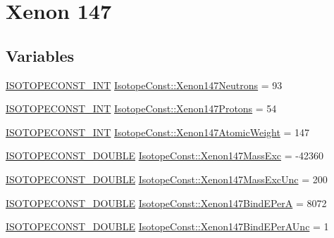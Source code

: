 \hypertarget{group___isotope_const-_xenon-_xe147}{}\section{Xenon 147}
\label{group___isotope_const-_xenon-_xe147}
\subsection*{Variables}
\begin{DoxyCompactItemize}
\item 
\mbox{\hyperlink{group___isotope_const-_macros_ga5f18360b3e99483a35c32d789e62621c}{I\+S\+O\+T\+O\+P\+E\+C\+O\+N\+S\+T\+\_\+\+I\+NT}} \mbox{\hyperlink{group___isotope_const-_xenon-_xe147_ga287624af3bd04def65eb9a491a60a459}{Isotope\+Const\+::\+Xenon147\+Neutrons}} = 93
\item 
\mbox{\hyperlink{group___isotope_const-_macros_ga5f18360b3e99483a35c32d789e62621c}{I\+S\+O\+T\+O\+P\+E\+C\+O\+N\+S\+T\+\_\+\+I\+NT}} \mbox{\hyperlink{group___isotope_const-_xenon-_xe147_ga8760fc45fccfb57b2619b30d8e229024}{Isotope\+Const\+::\+Xenon147\+Protons}} = 54
\item 
\mbox{\hyperlink{group___isotope_const-_macros_ga5f18360b3e99483a35c32d789e62621c}{I\+S\+O\+T\+O\+P\+E\+C\+O\+N\+S\+T\+\_\+\+I\+NT}} \mbox{\hyperlink{group___isotope_const-_xenon-_xe147_ga61a449ca5933362c6cceae5045a863a5}{Isotope\+Const\+::\+Xenon147\+Atomic\+Weight}} = 147
\item 
\mbox{\hyperlink{group___isotope_const-_macros_ga8f45a7272ce02c0b4c65c44636ed719a}{I\+S\+O\+T\+O\+P\+E\+C\+O\+N\+S\+T\+\_\+\+D\+O\+U\+B\+LE}} \mbox{\hyperlink{group___isotope_const-_xenon-_xe147_ga539ebada0711fb03d4ae15e50eb2a903}{Isotope\+Const\+::\+Xenon147\+Mass\+Exc}} = -\/42360
\item 
\mbox{\hyperlink{group___isotope_const-_macros_ga8f45a7272ce02c0b4c65c44636ed719a}{I\+S\+O\+T\+O\+P\+E\+C\+O\+N\+S\+T\+\_\+\+D\+O\+U\+B\+LE}} \mbox{\hyperlink{group___isotope_const-_xenon-_xe147_ga560b3220fae8073f2da464699b1b16b9}{Isotope\+Const\+::\+Xenon147\+Mass\+Exc\+Unc}} = 200
\item 
\mbox{\hyperlink{group___isotope_const-_macros_ga8f45a7272ce02c0b4c65c44636ed719a}{I\+S\+O\+T\+O\+P\+E\+C\+O\+N\+S\+T\+\_\+\+D\+O\+U\+B\+LE}} \mbox{\hyperlink{group___isotope_const-_xenon-_xe147_gaac54bed45adaab29ce676cdcb024c10b}{Isotope\+Const\+::\+Xenon147\+Bind\+E\+PerA}} = 8072
\item 
\mbox{\hyperlink{group___isotope_const-_macros_ga8f45a7272ce02c0b4c65c44636ed719a}{I\+S\+O\+T\+O\+P\+E\+C\+O\+N\+S\+T\+\_\+\+D\+O\+U\+B\+LE}} \mbox{\hyperlink{group___isotope_const-_xenon-_xe147_ga9951bdfbca347b64f1ca072dada435bd}{Isotope\+Const\+::\+Xenon147\+Bind\+E\+Per\+A\+Unc}} = 1

\end{DoxyCompactItemize}
